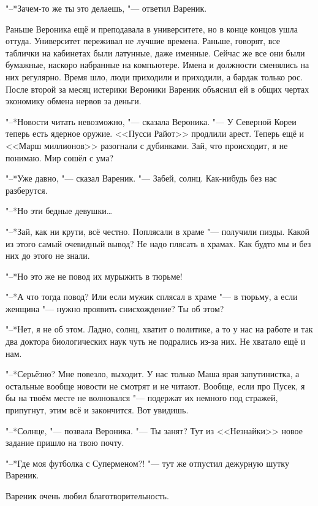 "--*Зачем-то же ты это делаешь, "--- ответил Вареник.

Раньше Вероника ещё и преподавала в университете, но в конце концов ушла оттуда.
Университет переживал не лучшие времена.
Раньше, говорят, все таблички на кабинетах были латунные, даже именные.
Сейчас же все они были бумажные, наскоро набранные на компьютере.
Имена и должности сменялись на них регулярно.
Время шло, люди приходили и приходили, а бардак только рос.
После второй за месяц истерики Вероники Вареник объяснил ей в общих чертах экономику обмена нервов за деньги.

\asterism

\textspace

\label{Thu_2012_05_10}

"--*Новости читать невозможно, "--- сказала Вероника.
"--- У Северной Кореи теперь есть ядерное оружие.
<<Пусси Райот>> продлили арест.
Теперь ещё и <<Марш миллионов>> разогнали с дубинками.
Зай, что происходит, я не понимаю.
Мир сошёл с ума?

"--*Уже давно, "--- сказал Вареник.
"--- Забей, солнц.
Как-нибудь без нас разберутся.

"--*Но эти бедные девушки\ldots{}

"--*Зай, как ни крути, всё честно.
Поплясали в храме "--- получили пизды.
Какой из этого самый очевидный вывод?
Не надо плясать в храмах.
Как будто мы и без них до этого не знали.

"--*Но это же не повод их мурыжить в тюрьме!

"--*А что тогда повод?
Или если мужик сплясал в храме "--- в тюрьму, а если женщина "--- нужно проявить снисхождение?
Ты об этом?

"--*Нет, я не об этом.
Ладно, солнц, хватит о политике, а то у нас на работе и так два доктора биологических наук чуть не подрались из-за них.
Не хватало ещё и нам.

"--*Серьёзно?
Мне повезло, выходит.
У нас только Маша ярая запутинистка, а остальные вообще новости не смотрят и не читают.
Вообще, если про Пусек, я бы на твоём месте не волновался "--- подержат их немного под стражей, припугнут, этим всё и закончится.
Вот увидишь.

\textspace

"--*Солнце, "--- позвала Вероника.
"--- Ты занят?
Тут из <<Незнайки>> новое задание пришло на твою почту.

"--*Где моя футболка с Суперменом?! "--- тут же отпустил дежурную шутку Вареник.

Вареник очень любил благотворительность.

